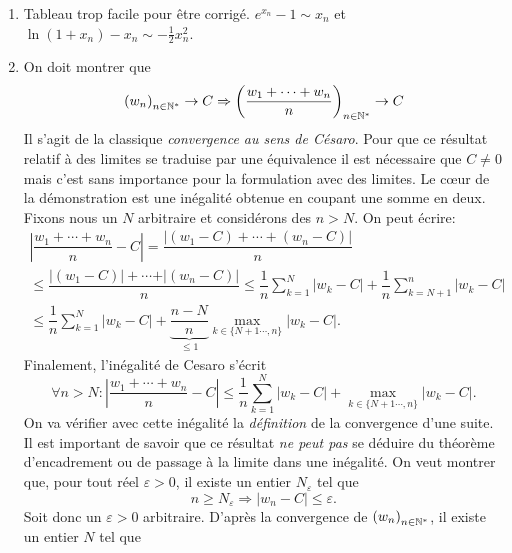 \begin{enumerate}
\item Tableau trop facile pour être corrigé.  $e^{x_n}-1 \sim x_n$ et $\ln (1+x_n)-x_n \sim -\frac{1}{2}x_n^2$.
\item  On doit montrer que 
\begin{displaymath}
 \left(w_n \right)_{n\in\mathbb{N}^*}\rightarrow C \Rightarrow 
\left(\dfrac{w_1+\cdots +w_n}{n} \right)_{n\in\mathbb{N}^*}\rightarrow C
\end{displaymath}
Il s'agit de la classique \emph{convergence au sens de C{\'e}saro}. Pour que ce résultat relatif à des limites se traduise par une équivalence il est nécessaire que $C\neq0$ mais c'est sans importance pour la formulation avec des limites.\newline
Le c{\oe}ur de la démonstration est une inégalité obtenue en coupant une somme en deux. Fixons nous un $N$ arbitraire et considérons des $n> N$. On peut écrire:
\begin{multline*}
 \left\vert \dfrac{w_1+\cdots +w_n}{n} -C\right\vert 
= \dfrac{\vert(w_1-C)+\cdots +(w_n-C)\vert}{n} \\
\leq \dfrac{\vert(w_1-C)\vert +\cdots +\vert(w_n-C)\vert}{n}
\leq \dfrac{1}{n}\sum_{k=1}^{N} \vert w_k-C \vert + \dfrac{1}{n}\sum_{k=N+1}^{n} \vert w_k-C \vert \\
\leq \dfrac{1}{n}\sum_{k=1}^{N} \vert w_k-C \vert + \underset{\leq 1}{\underbrace{\dfrac{n-N}{n}}}\max_{k\in \{N+1\cdots,n\}}\vert w_k-C \vert .
\end{multline*}
Finalement, l'inégalité de Cesaro s'écrit 
\begin{displaymath}
 \forall n>N :
 \left\vert \dfrac{w_1+\cdots +w_n}{n} -C\right\vert 
\leq
\dfrac{1}{n}\sum_{k=1}^{N} \vert w_k-C \vert + \max_{k\in \{N+1\cdots,n\}}\vert w_k-C \vert .
\end{displaymath}
On va vérifier avec cette inégalité la \emph{définition} de la convergence d'une suite. Il est important de savoir que ce résultat \emph{ne peut pas} se déduire du théorème d'encadrement ou de passage à la limite dans une inégalité.\newline
On veut montrer que, pour tout réel $\varepsilon>0$, il existe un entier $N_\varepsilon$ tel que 
\begin{displaymath}
 n\geq N_\varepsilon \Rightarrow \vert w_n-C \vert \leq \varepsilon .
\end{displaymath}
Soit donc un $\varepsilon>0$ arbitraire. D'après la convergence de $\left(w_n \right)_{n\in\mathbb{N}^*}$, il existe un entier $N$ tel que 
\begin{displaymath}

\end{displaymath}
\end{enumerate}
